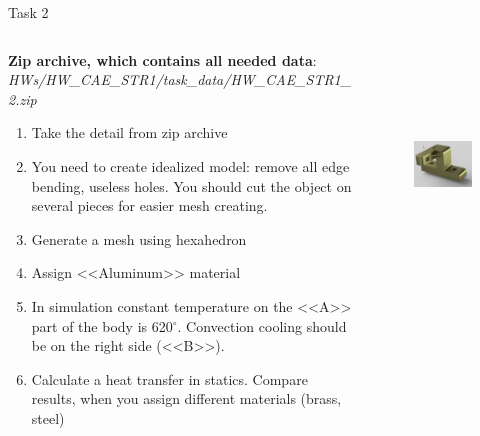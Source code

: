\documentclass[aspectratio=169]{beamer}
\begin{document}
\begin{frame}[t]{Task 2}
    \vspace{-0.4cm}
    \begin{columns}[T,onlytextwidth]
        \begin{column}{0.59\textwidth}
            \scriptsize
            \textbf{Zip archive, which contains all needed data}: \textit{HWs/HW\_CAE\_STR1/task\_data/HW\_CAE\_STR1\_2.zip}
            \begin{enumerate}
                \item Take the detail from zip archive
                \item You need to create idealized model: remove all edge bending, useless holes. You should cut the object on several pieces for easier mesh creating.
                \item Generate a mesh using hexahedron
                \item Assign <<Aluminum>> material
                \item In simulation constant temperature on the <<A>> part of the body is 620$^\circ$. Convection cooling should be on the right side (<<B>>).
                \item Calculate a heat transfer in statics. Compare results, when you assign different materials (brass, steel)
            \end{enumerate}
        \end{column}
        \begin{column}{0.39\textwidth}
            \begin{figure}[H]
                \centering\includegraphics[height=6cm,width=1\textwidth,keepaspectratio]{HW_CAE_STR1_2.png}
                \label{fig:HW_CAE_STR1_2.png}
            \end{figure}
        \end{column}
    \end{columns}
\end{frame}
\end{document}

